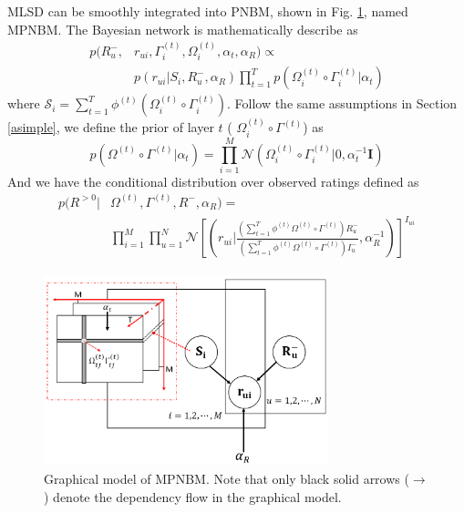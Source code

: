 \documentclass[conference]{IEEEtran}
\begin{document}
MLSD can be smoothly integrated into PNBM, shown in Fig. \ref{g:mpnbm}, named MPNBM. The Bayesian network is mathematically describe as
\begin{equation}\label{myeq:mpnbm}
\begin{split}
p(R_u^{-}, &  r_{ui}, \Gamma^{(t)}_{i}, \Omega^{(t)}_{i}, \alpha_t, \alpha_R) \propto \\
& p(r_{ui}|S_i,R_u^{-},\alpha_R)\prod_{t=1}^{T}  p(\Omega^{(t)}_{i} \circ \Gamma^{(t)}_{i} |\alpha_t)
\end{split}
\end{equation}
where $ \mathcal{S}_i =\sum_{t=1}^{T}\phi^{(t)}(\Omega^{(t)}_i \circ \Gamma^{(t)}_i)$.
Follow the same assumptions in Section \ref{asimple}, we define the prior of layer $t$   ( $\Omega^{(t)}_i \circ \Gamma^{(t)}$) as
\begin{equation}\label{myeq:mulsim}
 p(\Omega^{(t)} \circ \Gamma^{(t)}|\alpha_{t})=\prod_{i=1}^{M} \mathcal{N}(\Omega^{(t)}_{i} \circ \Gamma^{(t)}_{i}|0, \alpha_{t}^{-1}\mathbf{I})
\end{equation}
And we have the conditional distribution over observed ratings defined as
\begin{equation}\label{myeq:rmul}
\begin{split}
p(R^{>0}| & \Omega^{(t)},  \Gamma^{(t)}, R^-, \alpha_R) = \\
& \prod_{i=1}^{M}\prod_{u=1}^{N}\mathcal{N}[(r_{ui}|\frac{(\sum_{t=1}^{T}\phi^{(t)}\Omega^{(t)} \circ \Gamma^{(t)})R_u^{-}}{(\sum_{t=1}^{T}\phi^{(t)}\Omega^{(t)} \circ \Gamma^{(t)})I_u^{-}}, \alpha_R^{-1})]^{I_{ui}}
\end{split}
\end{equation}
\begin{figure}[t]
\centering
\includegraphics[height=2.2in, width=3.25in]{mpnbm}
\caption{Graphical model of MPNBM.  Note that only black solid arrows ($\rightarrow$) denote the dependency flow in the graphical model.}
\label{g:mpnbm}
\end{figure}
\end{document}
